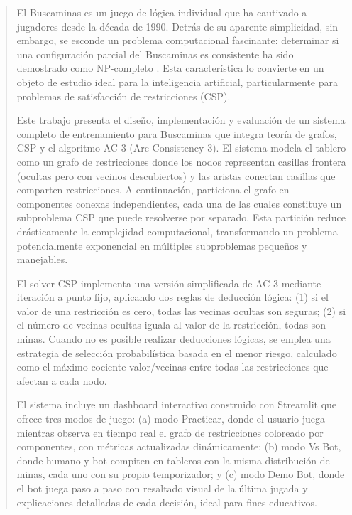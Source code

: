 \documentclass[12pt,a4paper]{article}
\begin{document}
\begin{abstract}
El Buscaminas es un juego de lógica individual que ha cautivado a jugadores desde la década de 1990. Detrás de su aparente simplicidad, sin embargo, se esconde un problema computacional fascinante: determinar si una configuración parcial del Buscaminas es consistente ha sido demostrado como NP-completo \cite{kaye2000minesweeper}. Esta característica lo convierte en un objeto de estudio ideal para la inteligencia artificial, particularmente para problemas de satisfacción de restricciones (CSP).

Este trabajo presenta el diseño, implementación y evaluación de un sistema completo de entrenamiento para Buscaminas que integra teoría de grafos, CSP y el algoritmo AC-3 (Arc Consistency 3). El sistema modela el tablero como un grafo de restricciones donde los nodos representan casillas frontera (ocultas pero con vecinos descubiertos) y las aristas conectan casillas que comparten restricciones. A continuación, particiona el grafo en componentes conexas independientes, cada una de las cuales constituye un subproblema CSP que puede resolverse por separado. Esta partición reduce drásticamente la complejidad computacional, transformando un problema potencialmente exponencial en múltiples subproblemas pequeños y manejables.

El solver CSP implementa una versión simplificada de AC-3 mediante iteración a punto fijo, aplicando dos reglas de deducción lógica: (1) si el valor de una restricción es cero, todas las vecinas ocultas son seguras; (2) si el número de vecinas ocultas iguala al valor de la restricción, todas son minas. Cuando no es posible realizar deducciones lógicas, se emplea una estrategia de selección probabilística basada en el menor riesgo, calculado como el máximo cociente valor/vecinas entre todas las restricciones que afectan a cada nodo.

El sistema incluye un dashboard interactivo construido con Streamlit que ofrece tres modos de juego: (a) modo Practicar, donde el usuario juega mientras observa en tiempo real el grafo de restricciones coloreado por componentes, con métricas actualizadas dinámicamente; (b) modo Vs Bot, donde humano y bot compiten en tableros con la misma distribución de minas, cada uno con su propio temporizador; y (c) modo Demo Bot, donde el bot juega paso a paso con resaltado visual de la última jugada y explicaciones detalladas de cada decisión, ideal para fines educativos.


\end{abstract}
\end{document}
